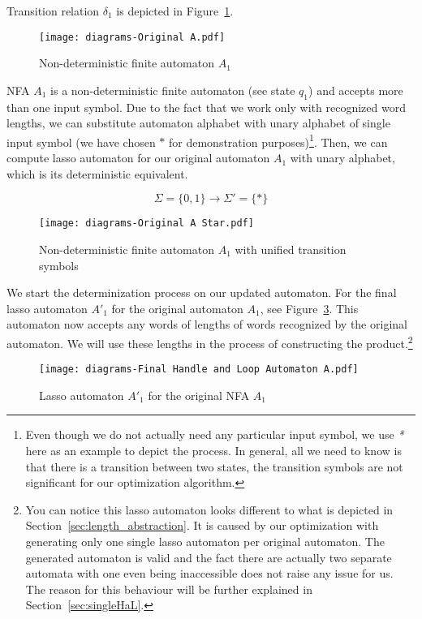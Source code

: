 Transition relation $\delta_1$ is depicted in Figure~\ref{fig:NFA_A1_orig}.

\begin{figure}[ht]
	\centering
	\texttt{[image: diagrams-Original A.pdf]}
	\caption{Non-deterministic finite automaton $A_1$}
	\label{fig:NFA_A1_orig}
\end{figure}

NFA $A_1$ is a non-deterministic finite automaton (see state $q_1$) and accepts more than one input symbol. Due to the fact that we work only with recognized word lengths, we can substitute automaton alphabet with unary alphabet of single input symbol (we have chosen $*$ for demonstration purposes)\footnote{Even though we do not actually need any particular input symbol, we use \emph{*} here as an example to depict the process. In general, all we need to know is that there is a transition between two states, the transition symbols are not significant for our optimization algorithm.}. Then, we can compute lasso automaton for our original automaton $A_1$ with unary alphabet, which is its deterministic equivalent.

$$\Sigma = \{0, 1\} \longrightarrow \Sigma' = \{*\} $$

\begin{figure}[ht]
	\centering
	\texttt{[image: diagrams-Original A Star.pdf]}
	\caption{Non-deterministic finite automaton $A_1$ with unified transition symbols}
	\label{fig:NFA_A1_star}
\end{figure}

We start the determinization process on our updated automaton. For the final lasso automaton $A'_1$ for the original automaton $A_1$, see Figure~\ref{fig:HaL_A1}. This automaton now accepts any words of lengths of words recognized by the original automaton. We will use these lengths in the process of constructing the product.\footnote{You can notice this lasso automaton looks different to what is depicted in Section~\ref{sec:length_abstraction}. It is caused by our optimization with generating only one single lasso automaton per original automaton. The generated automaton is valid and the fact there are actually two separate automata with one even being inaccessible does not raise any issue for us. The reason for this behaviour will be further explained in Section~\ref{sec:singleHaL}.}

 \begin{figure}[ht]
	\centering
	\texttt{[image: diagrams-Final Handle and Loop Automaton A.pdf]}
	\caption{Lasso automaton $A'_1$ for the original NFA $A_1$}
	\label{fig:HaL_A1}
\end{figure}



